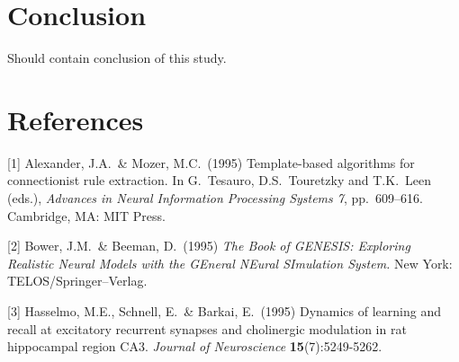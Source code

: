 \documentclass{article}
\begin{document}
\section{Conclusion}
Should contain conclusion of this study.

\section*{References}

\small

[1] Alexander, J.A.\ \& Mozer, M.C.\ (1995) Template-based algorithms
for connectionist rule extraction. In G.\ Tesauro, D.S.\ Touretzky and
T.K.\ Leen (eds.), {\it Advances in Neural Information Processing
  Systems 7}, pp.\ 609--616. Cambridge, MA: MIT Press.

[2] Bower, J.M.\ \& Beeman, D.\ (1995) {\it The Book of GENESIS:
  Exploring Realistic Neural Models with the GEneral NEural SImulation
  System.}  New York: TELOS/Springer--Verlag.

[3] Hasselmo, M.E., Schnell, E.\ \& Barkai, E.\ (1995) Dynamics of
learning and recall at excitatory recurrent synapses and cholinergic
modulation in rat hippocampal region CA3. {\it Journal of
  Neuroscience} {\bf 15}(7):5249-5262.
\end{document}
